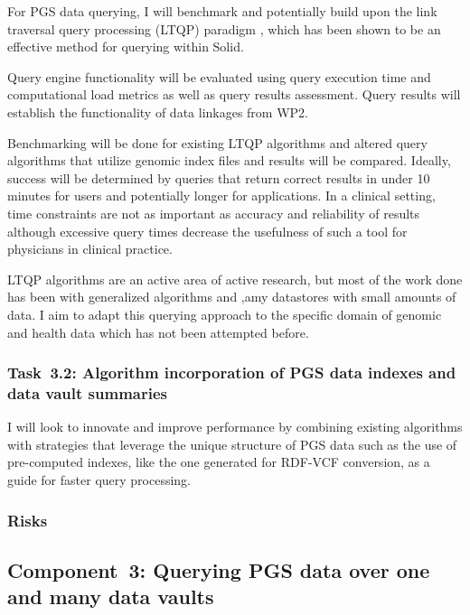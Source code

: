 \documentclass[a4paper,11pt]{article}
\begin{document}
\begin{refsection}
For PGS data querying, I will benchmark and potentially build upon the link traversal query processing (LTQP) paradigm \cite{taelman_evaluation_2023}, which has been shown to be an effective method for querying within Solid.  


Query engine functionality will be evaluated using query execution time and computational load metrics as well as query results assessment. 
Query results will establish the functionality of data linkages from WP2.

Benchmarking will be done for existing LTQP algorithms and altered query algorithms that utilize genomic index files and results will be compared.
Ideally, success will be determined by queries that return correct results in under 10 minutes for users and potentially longer for applications.
In a clinical setting, time constraints are not as important as accuracy and reliability of results although excessive query times decrease the usefulness of such a tool for physicians in clinical practice.

LTQP algorithms are an active area of active research, but most of the work done has been with generalized algorithms and ,amy datastores with small amounts of data.
I aim to adapt this querying approach to the specific domain of genomic and health data which has not been attempted before. 


\newcommand\WPcb{Algorithm incorporation of PGS data indexes and data vault summaries}
\subsubsection{Task~3.2: \WPcb}

I will look to innovate and improve performance by combining existing algorithms with strategies that leverage the unique structure of PGS data such as the use of pre-computed indexes, like the one generated for RDF-VCF conversion, as a guide for faster query processing.


\subsubsection{Risks}





\newcommand\WPd{Querying PGS data over one and many data vaults}
\subsection{Component~3: \WPd}

\end{refsection}
\end{document}
